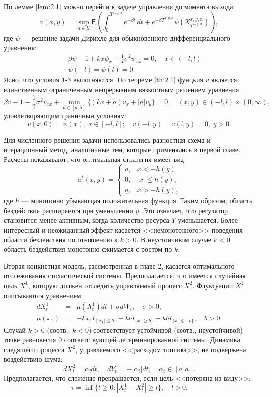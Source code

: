 По лемме \ref{lem:2.1} можно перейти к задаче управления до момента выхода:
$$ v(x,y)=\sup_{\alpha\in\mathcal U}\mathsf E\left(\int_0^{T^{x,y,\alpha}} e^{-\beta t}\,dt+e^{-\beta T^{x,y,\alpha}}\psi(X_{T^{x,y,\alpha}}^{x,y,\alpha})\right),$$
где $\psi$ --- решение задачи Дирихле для обыкновенного дифференциального уравнения:
\begin{eqnarray*}
&&\beta \psi -1 +kx\psi_x-\frac{1}{2}\sigma^2 \psi_{xx}=0, \quad x \in (-l,l)\\
&& \psi(-l)=\psi(l)=0.
\end{eqnarray*}
Ясно, что условия 1-3 выполняются. По теореме \ref{th:2.1} фунцкия $v$ является единственным ограниченным непрерывным вязкостным решением уравнения
\begin{equation} \label{eq:2.3.1}
\beta v -1-\frac{1}{2}\sigma^2 v_{xx}+\min_{a \in [\underline a,\overline{a}]}\{(kx+a)v_x+|a|v_y\}=0,\quad (x,y)\in (-l,l)\times(0,\infty),
\end{equation}
удовлетворяющим граничным условиям:
\begin{equation} \label{eq:2.3.2}
v(x,0)=\psi(x),\ x\in [-l,l];\quad v(-l,y)=v(l,y)=0,\ y>0.
\end{equation}

Для численного решения задачи использовались разностная схема и итерационный метод, аналогичные тем, которые применялись в первой главе. Расчеты показывают, что оптимальная стратегия имеет вид 
\begin{equation}
a^*(x,y) = \left \{
\begin{array}{cc} \overline a,& x< - h(y) \\
0,& |x|\le h(y),\\
\underline a, & x> - h(y),
\end{array}\right.
\end{equation} 
где $h$ --- монотонно убывающая положительная функция. Таким образом, область бездействия расширяется при уменьшении $y$. Это означает, что регулятор становится менее активным, когда количество ресурса $Y$ уменьшается. Более интересный и неожиданный эффект касается <<немонотонного>> поведения области бездействия по отношению к $k>0$. В неустойчивом случае $k<0$ область бездействия монотонно сжимается с ростом по $k$.


Вторая конкнетная модель, рассмотренная в главе 2, касается оптимального отслеживания стохастической системы. Предполагается, что имеется случайная цель $X^1$, которую должен отследить управляемый процесс $X^2$. Флуктуации $X^1$ описываются уравнением
\begin{eqnarray*}
dX^1_t &=& \mu(X^1_t) dt +\sigma dW_t,\quad \sigma>0,\\
\mu(x_1)&=& -k x_1 I_{\{|x_1|\le b\}} - k b I_{\{x_1\ge b\}}+k b I_{\{x_1\le -b\}},\quad b>0.
\end{eqnarray*}
Случай $k>0$ (соотв., $k<0$) соответствует устойчивой (соотв., неустойчивой) точке равновесия $0$ соответствующей детерминированной системы. Динамика следящего процесса $X^2$, управляемого <<расходом топлива>>, не подвержена воздействию шума:
$$ dX^2_t =\alpha_t dt,\quad dY_t =-|\alpha_t|dt,\quad \alpha_t\in [\underline a,\overline a].$$
Предполагается, что слежение прекращается, если цель <<потеряна из виду>>:
$$\tau=\inf\{t\ge 0:|X^1_t- X^2_t|\ge l\},\quad l>0.$$

